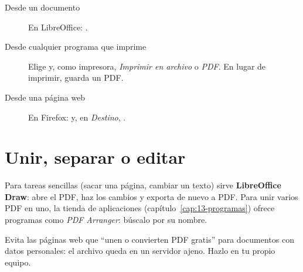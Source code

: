 \begin{description}
  \item[Desde un documento] En LibreOffice: .
  \item[Desde cualquier programa que imprime] Elige  y, como
    impresora, \emph{Imprimir en archivo} o \emph{PDF}. En lugar de
    imprimir, guarda un PDF.
  \item[Desde una página web] En Firefox:  y, en
    \emph{Destino}, .
\end{description}

\section{Unir, separar o editar}

Para tareas sencillas (sacar una página, cambiar un texto) sirve
\textbf{LibreOffice Draw}: abre el PDF, haz los cambios y exporta de nuevo
a PDF. Para unir varios PDF en uno, la tienda de aplicaciones
(capítulo~\ref{cap:13-programas}) ofrece programas como \emph{PDF Arranger}:
búscalo por su nombre.

\begin{cuidado}
Evita las páginas web que \enquote{unen o convierten PDF gratis} para
documentos con datos personales: el archivo queda en un servidor ajeno.
Hazlo en tu propio equipo.
\end{cuidado}

\fuentes
